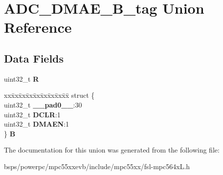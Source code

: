 \hypertarget{unionADC__DMAE__32B__tag}{}\section{A\+D\+C\+\_\+\+D\+M\+A\+E\+\_\+B\+\_\+tag Union Reference}
\label{unionADC__DMAE__32B__tag}
\subsection*{Data Fields}
\begin{DoxyCompactItemize}
\item 
\mbox{\label{unionADC__DMAE__32B__tag_ad9bdaa670485e901a8743010361886a3}} 
uint32\+\_\+t {\bfseries R}
\item 
\mbox{\label{unionADC__DMAE__32B__tag_a96e494881224a7b05875f05efdf40f27}} 
\begin{tabbing}
xx\=xx\=xx\=xx\=xx\=xx\=xx\=xx\=xx\=\kill
struct \{\\
\>uint32\_t {\bfseries \_\_pad0\_\_}:30\\
\>uint32\_t {\bfseries DCLR}:1\\
\>uint32\_t {\bfseries DMAEN}:1\\
\} {\bfseries B}\\

\end{tabbing}\end{DoxyCompactItemize}


The documentation for this union was generated from the following file\+:\begin{DoxyCompactItemize}
\item 
bsps/powerpc/mpc55xxevb/include/mpc55xx/fsl-\/mpc564x\+L.\+h\end{DoxyCompactItemize}
